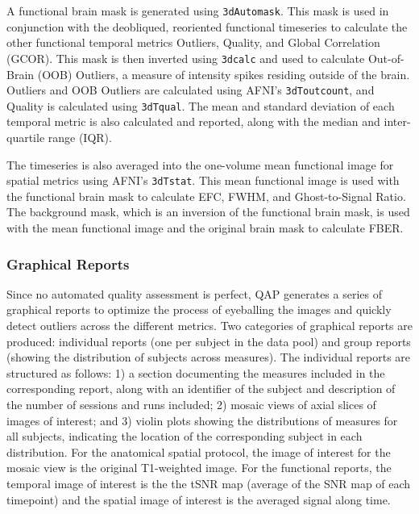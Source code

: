 A functional brain mask is generated using \texttt{3dAutomask}. This mask is used in conjunction with the deobliqued, reoriented functional timeseries to calculate the other functional temporal metrics Outliers, Quality, and Global Correlation (GCOR). This mask is then inverted using \texttt{3dcalc} and used to calculate Out-of-Brain (OOB) Outliers, a measure of intensity spikes residing outside of the brain. Outliers and OOB Outliers are calculated using AFNI's \texttt{3dToutcount}, and Quality is calculated using \texttt{3dTqual}. The mean and standard deviation of each temporal metric is also calculated and reported, along with the median and inter-quartile range (IQR).

The timeseries is also averaged into the one-volume mean functional image for spatial metrics using AFNI's \texttt{3dTstat}. This mean functional image is used with the functional brain mask to calculate EFC, FWHM, and Ghost-to-Signal Ratio. The background mask, which is an inversion of the functional brain mask, is used with the mean functional image and the original brain mask to calculate FBER.

\subsubsection{Graphical Reports}
\label{sec:21b}

Since no automated quality assessment is perfect, QAP generates a series of graphical reports to optimize the process of eyeballing the images and quickly detect outliers across the different metrics. Two categories of graphical reports are produced: individual reports (one per subject in the data pool) and group reports (showing the distribution of subjects across measures). The individual reports are structured as follows: 1) a section documenting the measures included in the corresponding report, along with an identifier of the subject and description of the number of sessions and runs included; 2) mosaic views of axial slices of images of interest; and 3) violin plots showing the distributions of measures for all subjects, indicating the location of the corresponding subject in each distribution. For the anatomical spatial protocol, the image of interest for the mosaic view is the original T1-weighted image. For the functional reports, the temporal image of interest is the the tSNR map (average of the SNR map of each timepoint) and the spatial image of interest is the averaged signal along time.


